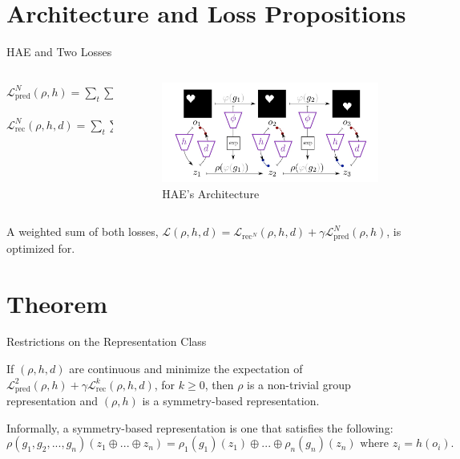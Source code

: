 \documentclass{beamer}
\begin{document}
\section{Architecture and Loss Propositions}
\begin{frame}{HAE and Two Losses}
  \begin{columns}
    \begin{column}{.6\textwidth}
      \begin{definition}
        $\mathcal{L}_{\text{pred}}^N(\rho, h) = \sum_{t}\sum_{j = 1}^{N} || h(o_{t+j}) -  (\prod_{i = 0}^{j-1} \rho(g_{t+i}))h(o_t)||  $
      \end{definition}
      \begin{definition}
        $\mathcal{L}_{\text{rec}}^N(\rho, h, d) = \sum_{t}\sum_{j = 1}^{N} || o_{t+j} -  d(\prod_{i = 0}^{j-1} \rho(g_{t+i}))h(o_t)||  $
      \end{definition}
   \end{column} 
    \begin{column}{.4\textwidth}
   \begin{figure}
    \centering
    \includegraphics[scale=.1]{hae.jpeg}
    \caption{HAE's Architecture}
   \end{figure} 
   \end{column} 
  \end{columns}
\vspace{10pt}
  A weighted sum of both losses, $\mathcal{L}(\rho, h, d) = \mathcal{L}_{\text{rec}^N}(\rho, h, d) + \gamma \mathcal{L}_{\text{pred}}^N(\rho, h)$, is optimized for.

\end{frame}
\section{Theorem}
\begin{frame}{Restrictions on the Representation Class}
 \begin{theorem}
  If $(\rho, h, d)$ are continuous and minimize the expectation of $\mathcal{L}_{\text{pred}}^2(\rho, h) + \gamma \mathcal{L}_{\text{rec}}^k(\rho, h, d)$, for $k \geq 0$, then $\rho$ is a non-trivial group representation and $(\rho, h)$ is a symmetry-based representation.
 \end{theorem} 
 Informally, a symmetry-based representation is one that satisfies the following: 
 \[ 
 \rho(g_1, g_2, ..., g_n)(z_1 \oplus ... \oplus z_n) = \rho_1(g_1)(z_1)  \oplus ... \oplus \rho_n(g_n)(z_n) \text{~where~} z_i = h(o_i)
 .\]
\end{frame}
\end{document}
